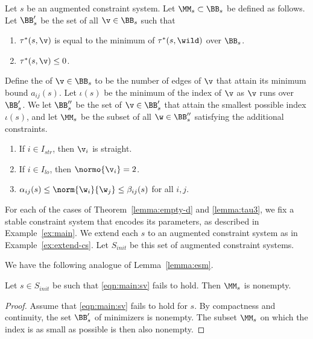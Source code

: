 \begin{definition}
Let $s$ be an augmented constraint system.
Let $\MM_{s}\subset \BB_{s}$ be defined as follows.
Let $\BB'_{s}$ be the set of all $\v\in \BB_{s}$ such that
\begin{enumerate}
\item $\tau^*(s,\v)$ is equal to the minimum of $\tau^*(s,\wild)$ over $\BB_{s}$.
\item $\tau^*(s,\v)\le 0$.
\end{enumerate}
Define the  of $\v\in \BB_s$ to be the number of edges of $\v$
that attain its minimum bound $a_{i j}(s)$.  Let $\iota(s)$ be the minimum
of the index of $\v$ as $\v$ runs over $\BB'_s$.  
We let $\BB''_{s}$  be the set of $\v\in \BB'_{s}$ that attain
the smallest possible index $\iota(s)$,
and let $\MM_s$ be the subset of all $\w\in\BB''_s$ satisfying the additional
constraints.
\begin{enumerate}
\item If $i\in I_{str}$,  then $\v_i$ is straight.
\item If $i\in I_{lo}$,  then $\normo{\v_i}=2$.
\item $\alpha_{ij}(s)\le \norm{\w_i}{\w_j}\le \beta_{ij}(s)$ for all $i,j$.
\end{enumerate}
\end{definition}



\begin{definition}[$S_{init}$] 
For each of the cases of Theorem~\ref{lemma:empty-d} and \ref{lemma:tau3}, we fix a
stable constraint system that encodes its parameters, as described in Example~\ref{ex:main}. 
We extend each $s$ to an augmented constraint system
as in Example~\ref{ex:extend-cs}.
Let $S_{init}$ be this set of  augmented constraint systems.
\end{definition}

We have the following analogue of Lemma~\ref{lemma:esm}.

\begin{lemma}\label{lemma:init}
Let $s\in S_{init}$ be such that
\eqref{eqn:main:sv} fails to hold.
Then $\MM_s$ is nonempty.
\end{lemma}

\begin{proof}  Assume that \eqref{eqn:main:sv} fails to hold for
$s$.  By compactness and continuity, the set 
$\BB'_s$ of minimizers is nonempty.   
The subset $\MM_s$ on which the index is as small as possible
is then also nonempty.
\end{proof}

